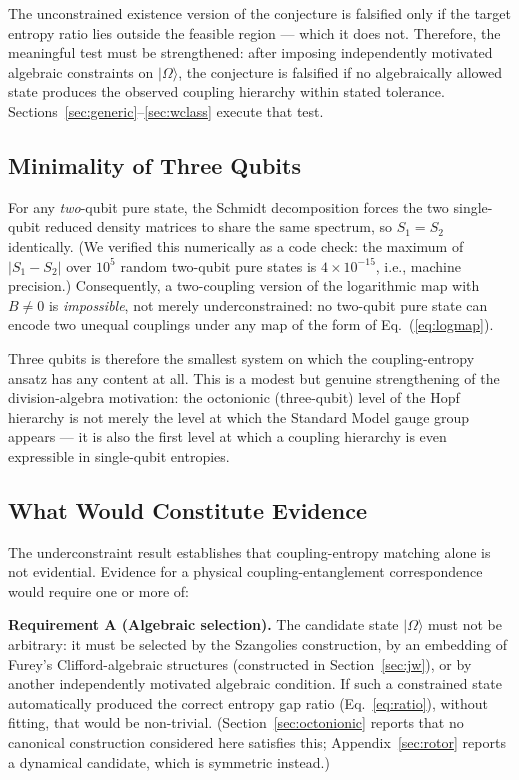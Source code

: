 \documentclass[11pt]{article}
\begin{document}
The unconstrained existence version of the conjecture is falsified only if the target entropy ratio lies outside the feasible region --- which it does not. Therefore, the meaningful test must be strengthened: after imposing independently motivated algebraic constraints on $|\Omega\rangle$, the conjecture is falsified if no algebraically allowed state produces the observed coupling hierarchy within stated tolerance. Sections~\ref{sec:generic}--\ref{sec:wclass} execute that test.

\subsection{Minimality of Three Qubits}
\label{sec:minimality}

For any \emph{two}-qubit pure state, the Schmidt decomposition forces the two single-qubit reduced density matrices to share the same spectrum, so $S_1 = S_2$ identically. (We verified this numerically as a code check: the maximum of $|S_1 - S_2|$ over $10^5$ random two-qubit pure states is $4 \times 10^{-15}$, i.e., machine precision.) Consequently, a two-coupling version of the logarithmic map with $B \ne 0$ is \emph{impossible}, not merely underconstrained: no two-qubit pure state can encode two unequal couplings under any map of the form of Eq.~(\ref{eq:logmap}).

Three qubits is therefore the smallest system on which the coupling-entropy ansatz has any content at all. This is a modest but genuine strengthening of the division-algebra motivation: the octonionic (three-qubit) level of the Hopf hierarchy is not merely the level at which the Standard Model gauge group appears --- it is also the first level at which a coupling hierarchy is even expressible in single-qubit entropies.

\subsection{What Would Constitute Evidence}
\label{sec:evidence}

The underconstraint result establishes that coupling-entropy matching alone is not evidential. Evidence for a physical coupling-entanglement correspondence would require one or more of:

\textbf{Requirement A (Algebraic selection).} The candidate state $|\Omega\rangle$ must not be arbitrary: it must be selected by the Szangolies construction, by an embedding of Furey's Clifford-algebraic structures (constructed in Section~\ref{sec:jw}), or by another independently motivated algebraic condition. If such a constrained state automatically produced the correct entropy gap ratio (Eq.~\ref{eq:ratio}), without fitting, that would be non-trivial. (Section~\ref{sec:octonionic} reports that no canonical construction considered here satisfies this; Appendix~\ref{sec:rotor} reports a dynamical candidate, which is symmetric instead.)
\end{document}

